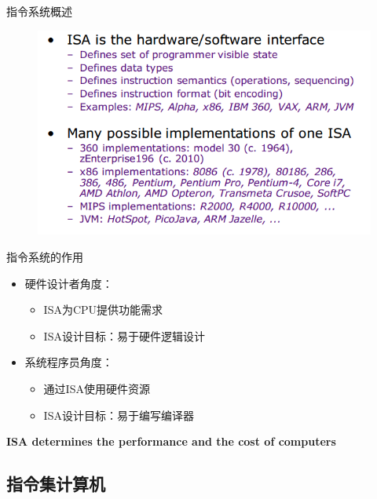\documentclass{myslide}
\begin{document}
\begin{frame}{指令系统概述}
\begin{figure}
\centering
\includegraphics[width=0.9\linewidth]{fig/Lecture2/overview.PNG}
\end{figure}
\end{frame}

\begin{frame}{指令系统的作用}
\begin{itemize}
	\item 硬件设计者角度：
	\begin{itemize}
		\item ISA为CPU提供功能需求
		\item ISA设计目标：易于硬件逻辑设计
	\end{itemize}
	\item 系统程序员角度：
	\begin{itemize}
		\item 通过ISA使用硬件资源
		\item ISA设计目标：易于编写编译器
	\end{itemize}
\end{itemize}
\begin{center}
\textbf{ISA determines the performance and the cost of computers}
\end{center}
\end{frame}

\subsection{指令集计算机}
\begin{frame}
\subsectionpage
\end{frame}
\end{document}
